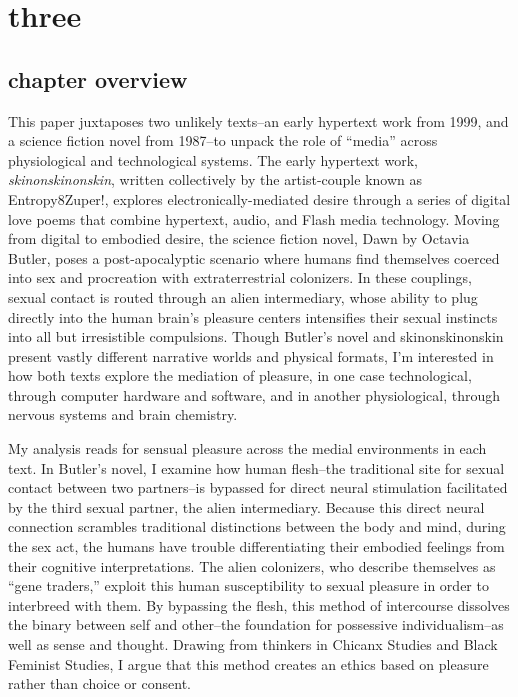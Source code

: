 \documentclass[11pt]{article}
\author{Filipa  Calado}
\date{\today}
\title{}
\begin{document}
\tableofcontents

\section{three}
\label{sec:orgd81b138}

\subsection{chapter overview}
\label{sec:orgb5e1e19}
This paper juxtaposes two unlikely texts--an early hypertext work from
1999, and a science fiction novel from 1987--to unpack the role of
“media” across physiological and technological systems. The early
hypertext work, \emph{skinonskinonskin}, written collectively by the
artist-couple known as Entropy8Zuper!, explores
electronically-mediated desire through a series of digital love poems
that combine hypertext, audio, and Flash media technology. Moving from
digital to embodied desire, the science fiction novel, Dawn by Octavia
Butler, poses a post-apocalyptic scenario where humans find themselves
coerced into sex and procreation with extraterrestrial colonizers. In
these couplings, sexual contact is routed through an alien
intermediary, whose ability to plug directly into the human brain’s
pleasure centers intensifies their sexual instincts into all but
irresistible compulsions. Though Butler’s novel and skinonskinonskin
present vastly different narrative worlds and physical formats, I’m
interested in how both texts explore the mediation of pleasure, in one
case technological, through computer hardware and software, and in
another physiological, through nervous systems and brain chemistry.

My analysis reads for sensual pleasure across the medial environments
in each text. In Butler’s novel, I examine how human flesh--the
traditional site for sexual contact between two partners--is bypassed
for direct neural stimulation facilitated by the third sexual partner,
the alien intermediary. Because this direct neural connection
scrambles traditional distinctions between the body and mind, during
the sex act, the humans have trouble differentiating their embodied
feelings from their cognitive interpretations. The alien colonizers,
who describe themselves as “gene traders,” exploit this human
susceptibility to sexual pleasure in order to interbreed with them. By
bypassing the flesh, this method of intercourse dissolves the binary
between self and other--the foundation for possessive
individualism--as well as sense and thought. Drawing from thinkers in
Chicanx Studies and Black Feminist Studies, I argue that this method
creates an ethics based on pleasure rather than choice or consent.
\end{document}
